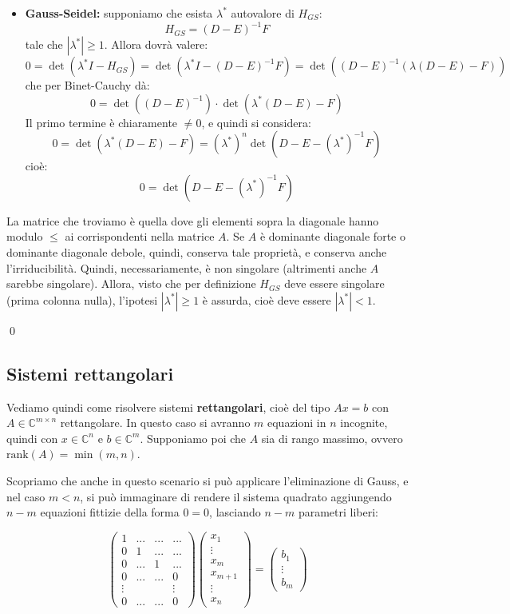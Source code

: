 \documentclass[a4paper,11pt]{article}
\begin{document}
\begin{enumerate}
\begin{itemize}
\item \textbf{Gauss-Seidel:} supponiamo che esista $\lambda^*$ autovalore di $H_{GS}$:
$$
H_{GS} = (D - E)^{-1} F
$$
tale che $|\lambda^*| \geq 1$.
Allora dovrà valere:
$$
0 = \det(\lambda^* I - H_{GS}) = \det\left (\lambda^* I - (D - E)^{-1} F \right) = \det \left( (D- E)^{-1} \left( \lambda(D - E) - F \right) \right)
$$
che per Binet-Cauchy dà:
$$
0 = \det \left( (D - E)^{-1} \right) \cdot \det \left(\lambda^* (D - E) - F \right)
$$
Il primo termine è chiaramente $\neq 0$, e quindi si considera:
$$
0 = \det \left( \lambda^* (D - E) - F \right) = \left(\lambda^*\right)^n \det \left(D - E - (\lambda^*)^{-1} F \right)
$$
cioè:
$$
0 = \det \left(D - E - (\lambda^*)^{-1} F \right)
$$
\end{itemize}
La matrice che troviamo è quella dove gli elementi sopra la diagonale hanno modulo $\leq$ ai corrispondenti nella matrice $A$.
Se $A$ è dominante diagonale forte o dominante diagonale debole, quindi, conserva tale proprietà, e conserva anche l'irriducibilità.
Quindi, necessariamente, è non singolare (altrimenti anche $A$ sarebbe singolare).
Allora, visto che per definizione $H_{GS}$ deve essere singolare (prima colonna nulla), l'ipotesi $|\lambda^*| \geq 1$ è assurda, cioè deve essere $|\lambda^*| < 1$.
\end{enumerate} \qed

\subsection{Sistemi rettangolari}
Vediamo quindi come risolvere sistemi \textbf{rettangolari}, cioè del tipo $Ax = b$ con $A \in \mathbb{C}^{m \times n}$ rettangolare.
In questo caso si avranno $m$ equazioni in $n$ incognite, quindi con $x \in \mathbb{C}^n$ e $b \in \mathbb{C}^m$.
Supponiamo poi che $A$ sia di rango massimo, ovvero $\mathrm{rank}(A) = \min(m, n)$.

Scopriamo che anche in questo scenario si può applicare l'eliminazione di Gauss, e nel caso $m < n$, si può immaginare di rendere il sistema quadrato aggiungendo $n - m$ equazioni fittizie della forma $0 = 0$, lasciando $n - m$ parametri liberi:

$$
\begin{pmatrix}
	1 & ... & ... & ... \\ 
	0 & 1 & ... & ... \\ 
	0 & ... & 1 & ... \\
	0 & ... & ... & 0 \\ 
	\vdots & & & \vdots \\ 
	0 & ... & ... & 0
\end{pmatrix}
\begin{pmatrix}
	x_1 \\ \vdots \\ x_m \\ x_{m + 1} \\ \vdots \\ x_n
\end{pmatrix}
=
\begin{pmatrix}
	b_1 \\ \vdots \\ b_m
\end{pmatrix}
$$
\end{document}
